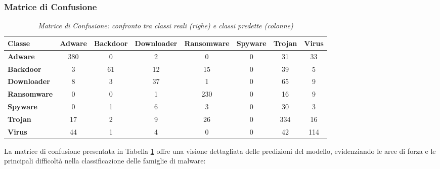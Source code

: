 \subsubsection{Matrice di Confusione}
\begin{table}[ht]
    \centering
    \hspace*{-2cm} 
    \begin{tabular}{@{}|l|c|c|c|c|c|c|c|@{}}
    \toprule
    \textbf{Classe}      & \textbf{Adware} & \textbf{Backdoor} & \textbf{Downloader} & \textbf{Ransomware} & \textbf{Spyware} & \textbf{Trojan} & \textbf{Virus} \\ \midrule
    \textbf{Adware}      & 380 & 0   & 2   & 0   & 0   & 31  & 33  \\\midrule
    \textbf{Backdoor}    & 3   & 61  & 12  & 15  & 0   & 39  & 5   \\\midrule
    \textbf{Downloader}  & 8   & 3   & 37  & 1   & 0   & 65  & 9   \\\midrule
    \textbf{Ransomware}  & 0   & 0   & 1   & 230 & 0   & 16  & 9   \\\midrule
    \textbf{Spyware}     & 0   & 1   & 6   & 3   & 0   & 30  & 3   \\\midrule
    \textbf{Trojan}      & 17  & 2   & 9   & 26  & 0   & 334 & 16  \\\midrule
    \textbf{Virus}       & 44  & 1   & 4   & 0   & 0   & 42  & 114 \\ \bottomrule
    \end{tabular}
    \vspace{.2cm}
    \caption{\emph{Matrice di Confusione: confronto tra classi reali (righe) e classi predette (colonne)}}
    \label{tab:confusion_matrix_1_esperimento}
\end{table}
La matrice di confusione presentata in Tabella \ref{tab:confusion_matrix_1_esperimento} offre una visione dettagliata delle predizioni del modello, evidenziando le aree di forza e le principali difficoltà nella classificazione delle famiglie di malware:
